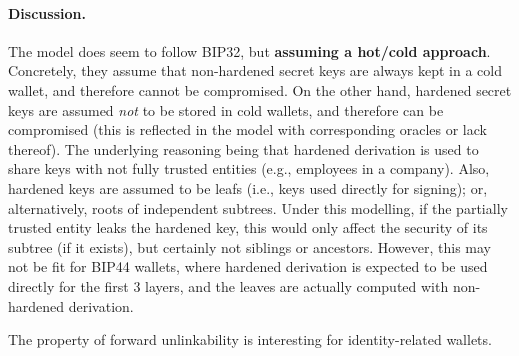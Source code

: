 \paragraph{Discussion.} %
The model does seem to follow BIP32, but \textbf{assuming a hot/cold approach}.
Concretely, they assume that non-hardened secret keys are always kept in a cold
wallet, and therefore cannot be compromised. On the other hand, hardened secret
keys are assumed \emph{not} to be stored in cold wallets, and therefore can be
compromised (this is reflected in the model with corresponding oracles or lack
thereof). The underlying reasoning being that hardened derivation is used to
share keys with not fully trusted entities (e.g., employees in a company). Also,
hardened keys are assumed to be leafs (i.e., keys used directly for signing); or,
alternatively, roots of independent subtrees. Under this modelling, if the
partially trusted entity leaks the hardened key, this would only affect the
security of its subtree (if it exists), but certainly not siblings or ancestors.
However, this may not be fit for BIP44 wallets, where hardened derivation is
expected to be used directly for the first 3 layers, and the leaves are actually
computed with non-hardened derivation.

The property of forward unlinkability is interesting for identity-related
wallets.


